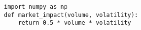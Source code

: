 \usepackage{listings}
\lstset{language=Python, basicstyle=\ttfamily\footnotesize}
\begin{lstlisting}
import numpy as np
def market_impact(volume, volatility):
    return 0.5 * volume * volatility
\end{lstlisting}
